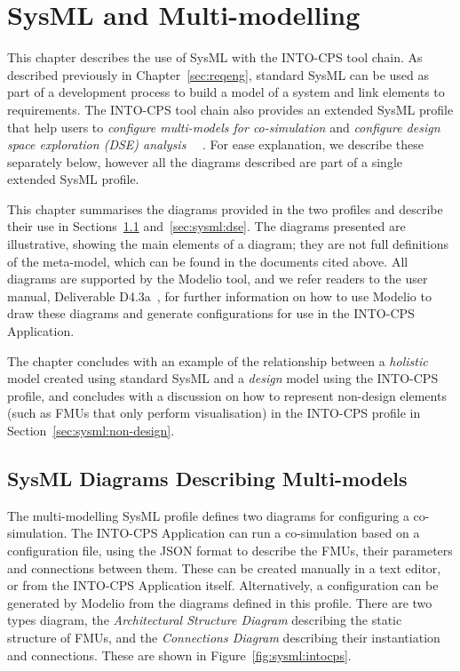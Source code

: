 \chapter{SysML and Multi-modelling}
\label{sec:sysml}

This chapter describes the use of SysML with the INTO-CPS tool chain. As described previously in Chapter~\ref{sec:reqeng}, standard SysML can be used as part of a development process to build a model of a system and link elements to requirements. The INTO-CPS tool chain also provides an extended SysML profile that help users to \emph{configure multi-models for co-simulation} and \emph{configure design space exploration (DSE) analysis}~ ~\cite{INTOCPSD2.1a,INTOCPSD2.2a,INTOCPSD2.3a,INTOCPSD41c,INTOCPSD4.2c,INTOCPSD4.3c}. For ease explanation, we describe these separately below, however all the diagrams described are part of a single extended SysML profile.

This chapter summarises the diagrams provided in the two profiles and describe their use in Sections~\ref{sec:sysml:intocps} and~\ref{sec:sysml:dse}. The diagrams presented are illustrative, showing the main elements of a diagram; they are not full definitions of the meta-model, which can be found in the documents cited above. All diagrams are supported by the Modelio tool, and we refer readers to the user manual, Deliverable D4.3a~\cite{INTOCPSD4.3a}, for further information on how to use Modelio to draw these diagrams and generate configurations for use in the INTO-CPS Application.

The chapter concludes with an example of the relationship between a \emph{holistic} model created using standard SysML and a \emph{design} model using the INTO-CPS profile, and concludes with a discussion on how to represent non-design elements (such as FMUs that only perform visualisation) in the INTO-CPS profile in Section~\ref{sec:sysml:non-design}.

\section{SysML Diagrams Describing Multi-models}
\label{sec:sysml:intocps}

The multi-modelling SysML profile defines two diagrams for configuring a co-simulation. The INTO-CPS Application can run a co-simulation based on a configuration file, using the JSON format to describe the FMUs, their parameters and connections between them. These can be created manually in a text editor, or from the INTO-CPS Application itself. Alternatively, a configuration can be generated by Modelio from the diagrams defined in this profile. There are two types diagram, the \emph{Architectural Structure Diagram} describing the static structure of FMUs, and the \emph{Connections Diagram} describing their instantiation and connections. These are shown in Figure~\ref{fig:sysml:intocps}.

